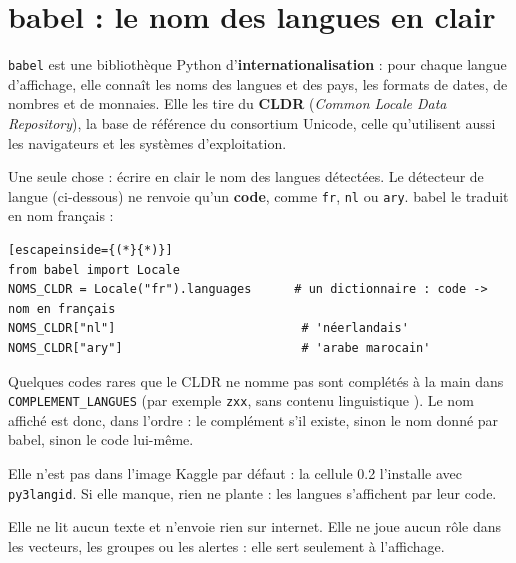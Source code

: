

\section{babel : le nom des langues en clair}

\begin{stepbox}[title={\faLanguage\quad Ce que c'est}]
\texttt{babel} est une bibliothèque Python d'\textbf{internationalisation} : pour chaque langue d'affichage,
elle connaît les noms des langues et des pays, les formats de dates, de nombres et de monnaies. Elle les
tire du \textbf{CLDR} (\emph{Common Locale Data Repository}), la base de référence du consortium Unicode,
celle qu'utilisent aussi les navigateurs et les systèmes d'exploitation.
\end{stepbox}

\begin{stepbox}[title={\faCogs\quad Ce qu'elle fait dans le notebook}]
Une seule chose : écrire en clair le nom des langues détectées. Le détecteur de langue (ci-dessous) ne
renvoie qu'un \textbf{code}, comme \texttt{fr}, \texttt{nl} ou \texttt{ary}. babel le traduit en nom
français :
\begin{lstlisting}[escapeinside={(*}{*)}]
from babel import Locale
NOMS_CLDR = Locale("fr").languages      # un dictionnaire : code -> nom en français
NOMS_CLDR["nl"]                          # 'néerlandais'
NOMS_CLDR["ary"]                         # 'arabe marocain'
\end{lstlisting}
Quelques codes rares que le CLDR ne nomme pas sont complétés à la main dans \texttt{COMPLEMENT\_LANGUES}
(par exemple \texttt{zxx}, \og sans contenu linguistique \fg). Le nom affiché est donc, dans l'ordre : le
complément s'il existe, sinon le nom donné par babel, sinon le code lui-même.
\end{stepbox}

\begin{tcbraster}[raster columns=2, raster equal height, raster column skip=8pt, raster every box/.style={unbreakable}]
\begin{conceptbox}[title={\faDownload\ Installée en 0.2}, unbreakable]
\small Elle n'est pas dans l'image Kaggle par défaut : la cellule 0.2 l'installe avec \texttt{py3langid}.
Si elle manque, rien ne plante : les langues s'affichent par leur code.
\end{conceptbox}
\begin{conceptbox}[title={\faLock\ Ne touche pas aux plaintes}, unbreakable]
\small Elle ne lit aucun texte et n'envoie rien sur internet. Elle ne joue aucun rôle dans les vecteurs, les
groupes ou les alertes : elle sert seulement à l'affichage.
\end{conceptbox}
\end{tcbraster}

